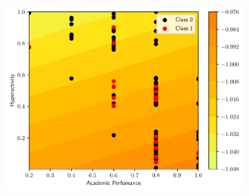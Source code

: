 \documentclass[conference]{IEEEtran}
\theoremstyle{definition}
\theoremstyle{remark}
\theoremstyle{remark}
\begin{document}
\begin{figure}
\begin{subfigure}[b]{0.32\textwidth}
        \includegraphics[width=\textwidth]{figs/svm-linear-contour-1-5.pdf}
        \caption{}
    \end{subfigure}


\end{figure}
\end{document}
